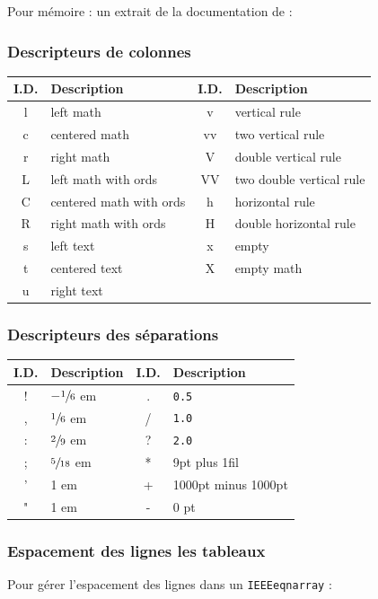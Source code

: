 Pour mémoire : un extrait de la documentation de  :


\subsubsection{Descripteurs de colonnes}

\setlength\extrarowheight{3pt}
\begin{tabular}{|c|l||c|l|}
	\hline
	I.D. & Description & I.D. & Description \tabularnewline
	\hline
	l & left math & v & vertical rule \tabularnewline
	c & centered math & vv & two vertical rule \tabularnewline
	r & right math & V & double vertical rule \tabularnewline
	L & left math with ords & VV & two double vertical rule \tabularnewline
	C & centered math with ords & h & horizontal rule\tabularnewline
	R & right math with ords & H & double horizontal rule\tabularnewline
	s & left text & x & empty \tabularnewline
	t & centered text & X & empty math \tabularnewline
	u & right text & & \tabularnewline
	\hline
\end{tabular}


\subsubsection{Descripteurs des séparations}

\begin{tabular}{|c|l||c|l|}
	\hline
	I.D. & Description & I.D. & Description \tabularnewline
	\hline
	! & $-\sfrac{1}{6}$ em & . & \texttt{0.5\arraycolsep} \tabularnewline
	, & $\sfrac{1}{6}$ em  & / & \texttt{1.0\arraycolsep} \tabularnewline
	: & $\sfrac{2}{9}$ em  & ? & \texttt{2.0\arraycolsep} \tabularnewline
	; & $\sfrac{5}{18}$ em  & * & 9pt plus 1fil\tabularnewline
	' & 1 em & + & 1000pt minus 1000pt\tabularnewline
	" & 1 em & - & 0 pt\tabularnewline
	\hline
\end{tabular}


\subsubsection{Espacement des lignes les tableaux}
Pour gérer l'espacement des lignes dans un \texttt{IEEEeqnarray} :



